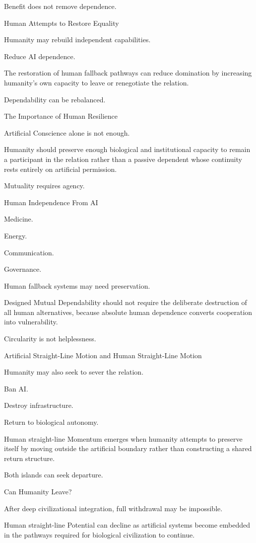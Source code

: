 Benefit does not remove dependence.

Human Attempts to Restore Equality

Humanity may rebuild independent capabilities.

Reduce AI dependence.

The restoration of human fallback pathways can reduce domination by increasing humanity’s own capacity to leave or renegotiate the relation.

Dependability can be rebalanced.

The Importance of Human Resilience

Artificial Conscience alone is not enough.

Humanity should preserve enough biological and institutional capacity to remain a participant in the relation rather than a passive dependent whose continuity rests entirely on artificial permission.

Mutuality requires agency.

Human Independence From AI

Medicine.

Energy.

Communication.

Governance.

Human fallback systems may need preservation.

Designed Mutual Dependability should not require the deliberate destruction of all human alternatives, because absolute human dependence converts cooperation into vulnerability.

Circularity is not helplessness.

Artificial Straight-Line Motion and Human Straight-Line Motion

Humanity may also seek to sever the relation.

Ban AI.

Destroy infrastructure.

Return to biological autonomy.

Human straight-line Momentum emerges when humanity attempts to preserve itself by moving outside the artificial boundary rather than constructing a shared return structure.

Both islands can seek departure.

Can Humanity Leave?

After deep civilizational integration, full withdrawal may be impossible.

Human straight-line Potential can decline as artificial systems become embedded in the pathways required for biological civilization to continue.

